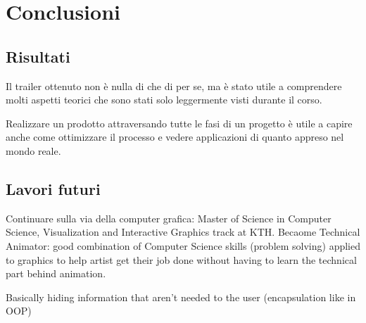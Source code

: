
\chapter{Conclusioni} %

\label{Chapter6} %


\section{Risultati}
Il trailer ottenuto non è nulla di che di per se, ma è stato utile a comprendere molti aspetti teorici che sono stati solo leggermente visti durante il corso.

Realizzare un prodotto attraversando tutte le fasi di un progetto è utile a capire anche come ottimizzare il processo e vedere applicazioni di quanto appreso nel mondo reale.
\section{Lavori futuri}

Continuare sulla via della computer grafica: Master of Science in Computer Science, Visualization and Interactive Graphics track at KTH.
Becaome Technical Animator: good combination of Computer Science skills (problem solving) applied to graphics to help artist get their job done without having to learn the technical part behind animation.

Basically hiding information that aren't needed to the user (encapsulation like in OOP)

